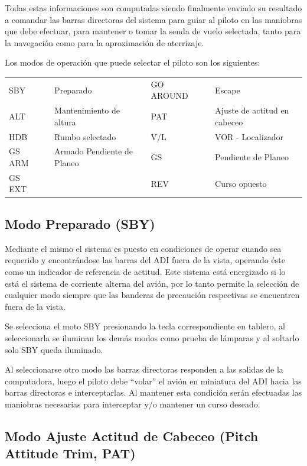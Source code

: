 Todas estas informaciones son computadas siendo finalmente enviado su
resultado a comandar las barras directoras del sistema para guiar al
piloto en las maniobras que debe efectuar, para mantener o tomar la
senda de vuelo selectada, tanto para la navegaci\'on como para la
aproximaci\'on de aterrizaje.

Los modos de operaci\'on que puede selectar el piloto son los siguientes:

  \begin{tabular}{lm{3mm}llm{3mm}l}
\rowcolor{cyan!10}
    	SBY &  & Preparado &
	GO AROUND &  & Escape \\
\rowcolor{yellow!10}
	ALT &  & Mantenimiento de altura    &
	PAT &  & Ajuste de actitud en cabeceo \\
\rowcolor{cyan!10}
	HDB &  & Rumbo selectado &
	V/L &  & VOR - Localizador \\
\rowcolor{yellow!10}
        GS ARM & & Armado Pendiente de Planeo &
	GS & & Pendiente de Planeo \\
\rowcolor{cyan!10}
	GS EXT & &  &
	REV & & Curso opuesto \\
  \end{tabular}

\subsection{Modo Preparado (SBY)}
\label{sec:modo.sby}
Mediante el mismo el sistema es puesto en condiciones de operar cuando sea
requerido y encontr\'andose las barras del ADI fuera de la vista,
operando \'este como un indicador de referencia de actitud.
Este sistema est\'a energizado si lo est\'a el sistema de corriente
alterna del avi\'on, por lo tanto permite la selecci\'on de cualquier modo siempre que las banderas de precauci\'on respectivas se encuentren fuera de la
vista.

Se selecciona el moto SBY presionando la tecla correspondiente
en tablero, al seleccionarla se iluminan los dem\'as modos
como prueba de l\'amparas y al soltarlo solo SBY queda iluminado.

Al seleccionarse otro modo las barras directoras responden a las salidas
de la computadora, luego el piloto debe ``volar'' el avi\'on en miniatura
del ADI hacia las barras directoras e interceptarlas. Al mantener esta
condici\'on ser\'an efectuadas las maniobras necesarias para interceptar
y/o mantener un curso deseado.

\subsection{Modo Ajuste Actitud de Cabeceo (Pitch Attitude Trim, PAT)}
\label{sec:modo.ajuste.pitch}

